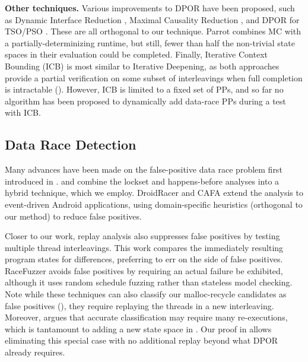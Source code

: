 {\bf Other techniques.} Various improvements to DPOR have been proposed, such as Dynamic Interface Reduction \cite{demeter}, Maximal Causality Reduction \cite{mcr}, and DPOR for TSO/PSO \cite{tsopso}.
These are all orthogonal to our technique.
Parrot \cite{parrot} combines MC with a partially-determinizing runtime, but still, fewer than half the non-trivial state spaces in their evaluation could be completed.
Finally, Iterative Context Bounding (ICB) \cite{chess-icb} is most similar to Iterative Deepening,
as both approaches provide a partial verification on some subset of interleavings when full completion is intractable (\sect{\ref{sec:future}}).
However, ICB is limited to a fixed set of PPs, and so far no algorithm has been proposed to dynamically add data-race PPs during a test with ICB.

\subsection{Data Race Detection}

Many advances have been made on the false-positive data race problem first introduced in \cite{eraser}.
\cite{hybriddatarace} and \cite{tsan} combine the lockset and happens-before analyses into a hybrid technique, which we employ.
DroidRacer \cite{droidracer} and CAFA \cite{cafa} extend the analysis to event-driven Android applications, using domain-specific heuristics (orthogonal to our method) to reduce false positives. %

Closer to our work, replay analysis \cite{recordreplaydrs} also suppresses false positives by testing multiple thread interleavings.
This work compares the immediately resulting program states for differences,
preferring to err on the side of false positives.
RaceFuzzer \cite{racefuzzer} avoids false positives by requiring an actual failure be exhibited,
although it uses random schedule fuzzing rather than stateless model checking.
Note while these techniques can also classify our malloc-recycle candidates as false positives (\sect{\ref{sec:recycle}}),
they require replaying the threads in a new interleaving.
Moreover, \cite{portend} argues that accurate classification may require many re-executions,
which is tantamount to adding a new state space in \quicksand.
Our proof in \sect{\ref{sec:recycle}} allows eliminating this special case with no additional replay beyond what DPOR already requires.

